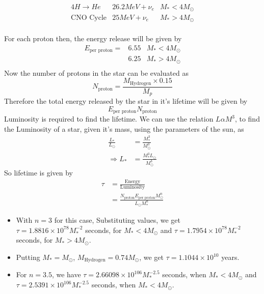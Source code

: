 \documentclass[paper=a4, fontsize=11pt]{scrartcl} %
\numberwithin{equation}{section} %
\numberwithin{figure}{section} %
\numberwithin{table}{section} %
\begin{document}
	\begin{equation}
	\begin{array}{lcr}
		4H \rightarrow He & 26.2 MeV + \nu_e & M_*<4M_\odot \\
		\text{CNO Cycle} & 25 MeV + \nu_e & M_*>4M_\odot \\
	\end{array}
	\end{equation}
	\par	
	For each proton then, the energy release will be given by
	\begin{equation}
	\begin{array}{ccc}
		E_\text{per proton} = &6.55 & M_*<4M_\odot \\
		& 6.25 & M_*>4M_\odot \\
	\end{array}
	\end{equation}
	Now the number of protons in the star can be evaluated as 
	\begin{equation}
		N_\text{proton}=\frac{M_\text{Hydrogen}\times 0.15}{M_p}
	\end{equation}
	Therefore the total energy released by the star in it's lifetime will be given by 
	\begin{equation}
		E_\text{per proton}N_\text{proton}
	\end{equation}
	Luminosity is required to find the lifetime. We can use the relation $L \alpha M^3$, to find the Luminosity of a star, given it's mass, using the parameters of the sun, as
	\begin{equation}
	\begin{split}
		\frac{L_*}{L_\odot}&=\frac{M_*^3}{M_\odot^3} \\
		\Rightarrow L_*&=\frac{M_*^3L_\odot}{M_\odot^3}
	\end{split}
	\end{equation}
	So lifetime is given by 
	\begin{equation}
	\begin{split}
		\tau &= \frac{\text{Energy}}{\text{Luminosity}} \\
		&=  \frac{N_\text{proton}E_\text{per proton} M_\odot^n}{L_\odot M_*^n}
	\end{split}
	\end{equation}
	
	\begin{itemize}
		\item With $n=3$ for this case, Substituting values, we get\\
	$\tau = 1.8816\times 10^{78} M_*^{-2}$ seconds, for $M_*<4M_\odot$ and $\tau = 1.7954 \times 10^{78} M_*^{-2}$ seconds, for $M_*>4M_\odot$.
		\item Putting $M_*=M_\odot$, $M_\text{Hydrogen}=0.74M_\odot$, we get $\tau=1.1044 \times 10^{10}$ years.
		\item For $n=3.5$, we have $\tau = 2.66098 \times 10^{106} M_*^{-2.5}$ seconds, when $M_*<4M_\odot$ and $\tau=2.5391\times 10^{106} M_*^{-2.5}$ seconds, when $M_*<4M_\odot$.
	\end{itemize}
\end{document}
